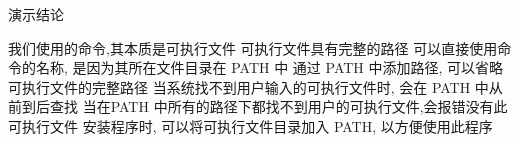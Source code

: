 

\begin{frame}{演示结论}
    \begin{myoutline}
        \1 我们使用的命令,其本质是可执行文件
            \2 可执行文件具有完整的路径
            \2 可以直接使用命令的名称, 是因为其所在文件目录在 PATH 中
        \1 通过 PATH 中添加路径, 可以省略可执行文件的完整路径
            \2 当系统找不到用户输入的可执行文件时, 会在 PATH 中从前到后查找
            \2 当在PATH 中所有的路径下都找不到用户的可执行文件,会报错没有此可执行文件
        \1 安装程序时, 可以将可执行文件目录加入 PATH, 以方便使用此程序
    \end{myoutline}
\end{frame}



